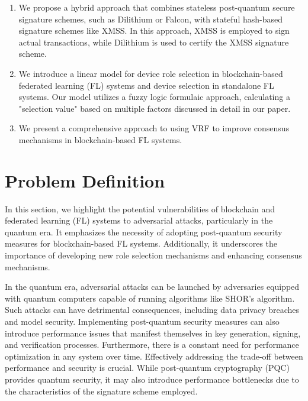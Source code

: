 \begin{enumerate}
\item We propose a hybrid approach that combines stateless post-quantum secure signature schemes, such as Dilithium or Falcon, with stateful hash-based signature schemes like XMSS. In this approach, XMSS is employed to sign actual transactions, while Dilithium is used to certify the XMSS signature scheme.

\item We introduce a linear model for device role selection in blockchain-based federated learning (FL) systems and device selection in standalone FL systems. Our model utilizes a fuzzy logic formulaic approach, calculating a "selection value" based on multiple factors discussed in detail in our paper.

\item We present a comprehensive approach to using VRF to improve consensus mechanisms in blockchain-based FL systems.
\end{enumerate}

\section{Problem Definition}
In this section, we highlight the potential vulnerabilities of
blockchain and federated learning (FL) systems to adversarial attacks, particularly in the quantum era. 
It emphasizes the necessity of adopting post-quantum security measures for blockchain-based FL systems. 
Additionally, it underscores the importance of developing new role selection mechanisms and enhancing consensus mechanisms.

In the quantum era, adversarial attacks can be launched by adversaries equipped with quantum computers capable of running algorithms like SHOR's algorithm. 
Such attacks can have detrimental consequences, including data privacy breaches and model security. 
Implementing post-quantum security measures can also introduce performance issues that manifest themselves in key generation, signing, and verification processes. 
Furthermore, there is a constant need for performance optimization in any system over time. 
Effectively addressing the trade-off between performance and security is crucial. 
While post-quantum cryptography (PQC) provides quantum security, 
it may also introduce performance bottlenecks due to the characteristics of the signature scheme employed.

